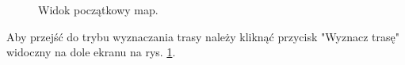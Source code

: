 \setlength{\fboxrule}{0.5pt}
\begin{figure}[H]
    \centering
    \caption{Widok początkowy map.}
    \label{test:map1}
\end{figure}

Aby przejść do trybu wyznaczania trasy należy kliknąć przycisk "Wyznacz trasę" widoczny na dole ekranu na rys. \ref{test:map1}.

